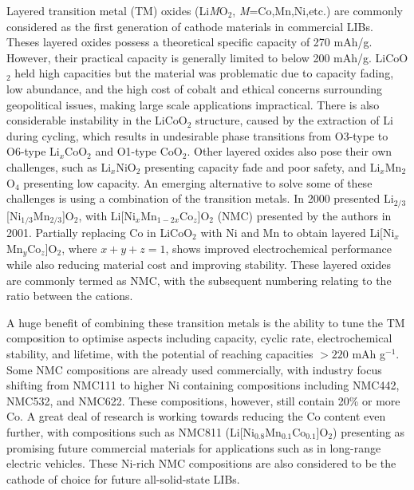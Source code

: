 \documentclass[../main.tex]{subfiles}
\begin{document}
Layered transition metal (TM) oxides (Li\textit{M}O$_2$, \textit{M}=Co,Mn,Ni,etc.) are commonly considered as the first generation of cathode materials in commercial LIBs. Theses layered oxides possess a theoretical specific capacity of 270 mAh/g. However, their practical capacity is generally limited to below 200 mAh/g. \cite{myung2017nickel} LiCoO$_2$ held high capacities but the material was problematic due to capacity fading, low abundance, and the high cost of cobalt and ethical concerns surrounding geopolitical issues, making large scale applications impractical. \cite{mo2018impact} There is also considerable instability in the LiCoO$_2$ structure, caused by the extraction of Li during cycling, which results in undesirable phase transitions from O3-type to O6-type Li$_x$CoO$_2$ and O1-type CoO$_2$. \cite{goonetilleke2018structural,chen2002staging} Other layered oxides also pose their own challenges, such as Li$_x$NiO$_2$ presenting capacity fade and poor safety, \cite{min2016comparative} and Li$_x$Mn$_2$O$_4$ presenting low capacity. \cite{tian2018performance} An emerging alternative to solve some of these challenges is using a combination of the transition metals. In 2000 \citeauthor{paulsen2000o2} presented Li$_{2/3}$[Ni$_{1/3}$Mn$_{2/3}$]O$_2$, \cite{paulsen2000o2,paulsen20002} with Li[Ni$_x$Mn$_{1-2x}$Co$_z$]O$_2$ (NMC) presented by the authors in 2001. \cite{lu2001layered} Partially replacing Co in LiCoO$_2$ with Ni and Mn to obtain layered Li[Ni$_x$Mn$_y$Co$_z$]O$_2$, \cite{rozier2015li} where $x+y+z=1$, shows improved electrochemical performance while also reducing material cost and improving stability.\cite{ohzuku2001layered} These layered oxides are commonly termed as NMC, with the subsequent numbering relating to the ratio between the cations.

A huge benefit of combining these transition metals is the ability to tune the TM composition to optimise aspects including capacity, cyclic rate, electrochemical stability, and lifetime, with the potential of reaching capacities $>220$ mAh g$^{-1}$. \cite{duan2019insights} Some NMC compositions are already used commercially, with industry focus shifting from NMC111 to higher Ni containing compositions including NMC442, NMC532, and NMC622. \cite{zhang2018structural} These compositions, however, still contain 20\% or more Co. A great deal of research is working towards reducing the Co content even further, with compositions such as NMC811 (Li[Ni$_{0.8}$Mn$_{0.1}$Co$_{0.1}$]O$_2$) presenting as promising future commercial materials for applications such as in long-range electric vehicles. \cite{azevedo2018mining} These Ni-rich NMC compositions are also considered to be the cathode of choice for future all-solid-state LIBs. \cite{myung2017nickel}
\end{document}
